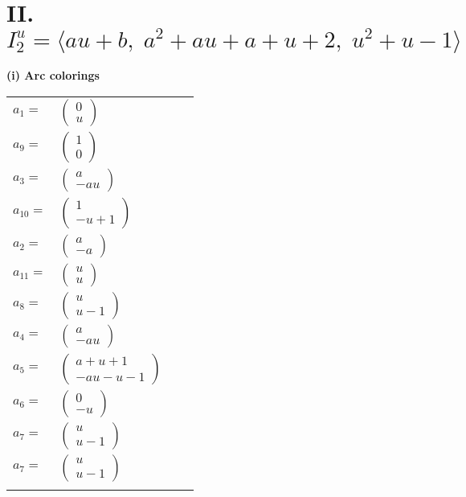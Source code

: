 \documentclass[1p]{elsarticle_modified}
\theoremstyle{definition}
\begin{document}
\centering \section*{II. $I^u_{2}= \langle a u+b,\;a^2+a u+a+u+2,\;u^2+u-1 \rangle$}
\flushleft \textbf{(i) Arc colorings}\\
\begin{tabular}{m{7pt} m{180pt} m{7pt} m{180pt} }
\flushright $a_{1}=$&$\begin{pmatrix}0\\u\end{pmatrix}$ \\
\flushright $a_{9}=$&$\begin{pmatrix}1\\0\end{pmatrix}$ \\
\flushright $a_{3}=$&$\begin{pmatrix}a\\- a u\end{pmatrix}$ \\
\flushright $a_{10}=$&$\begin{pmatrix}1\\- u+1\end{pmatrix}$ \\
\flushright $a_{2}=$&$\begin{pmatrix}a\\- a\end{pmatrix}$ \\
\flushright $a_{11}=$&$\begin{pmatrix}u\\u\end{pmatrix}$ \\
\flushright $a_{8}=$&$\begin{pmatrix}u\\u-1\end{pmatrix}$ \\
\flushright $a_{4}=$&$\begin{pmatrix}a\\- a u\end{pmatrix}$ \\
\flushright $a_{5}=$&$\begin{pmatrix}a+u+1\\- a u- u-1\end{pmatrix}$ \\
\flushright $a_{6}=$&$\begin{pmatrix}0\\- u\end{pmatrix}$ \\
\flushright $a_{7}=$&$\begin{pmatrix}u\\u-1\end{pmatrix}$\\ \flushright $a_{7}=$&$\begin{pmatrix}u\\u-1\end{pmatrix}$\\&\end{tabular}
\end{document}
